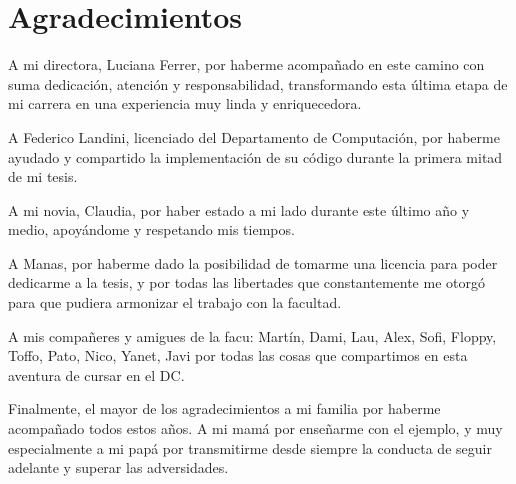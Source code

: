\chapter*{Agradecimientos}

%

A mi directora, Luciana Ferrer, por haberme acompañado en este camino con
suma dedicación, atención y responsabilidad, transformando esta última etapa
de mi carrera en una experiencia muy linda y enriquecedora.

A Federico Landini, licenciado del Departamento de Computación, por haberme
ayudado y compartido la implementación de su código
durante la primera mitad de mi tesis.

A mi novia, Claudia, por haber estado a mi lado durante este último año y medio,
apoyándome y respetando mis tiempos.

A Manas, por haberme dado la posibilidad de tomarme una licencia para poder
dedicarme a la tesis, y por todas las libertades que constantemente me
otorgó para que pudiera armonizar el trabajo con la facultad.

A mis compañeres y amigues de la facu: Martín, Dami, Lau, Alex,
Sofi, Floppy, Toffo, Pato, Nico,
Yanet, Javi por todas las cosas que compartimos en esta
aventura de cursar en el DC.

Finalmente, el mayor de los
agradecimientos a mi familia por haberme acompañado todos estos años.
A mi mamá por enseñarme con el ejemplo, y muy especialmente a mi papá por
transmitirme desde siempre la conducta de
seguir adelante y superar las adversidades.

